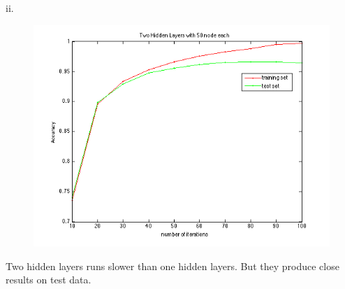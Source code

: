 \documentclass{article} %
\begin{document}
ii. 

\begin{figure}[htbp] %
   \centering
   \includegraphics[width=5in]{img/p82.png} 
\end{figure}

Two hidden layers runs slower than one hidden layers.  But they produce close results on test data.

\begin{lstlisting}[frame=single]  % Start your code-block


\end{lstlisting}
\end{document}
